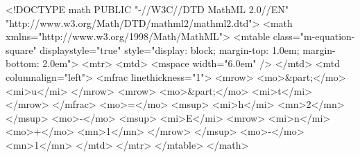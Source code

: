 <!DOCTYPE math 
    PUBLIC "-//W3C//DTD MathML 2.0//EN"
           "http://www.w3.org/Math/DTD/mathml2/mathml2.dtd">
<math xmlns="http://www.w3.org/1998/Math/MathML">
<mtable class="m-equation-square" displaystyle="true" style="display: block; margin-top: 1.0em; margin-bottom: 2.0em">
	<mtr>
		<mtd>
			<mspace width="6.0em" />
		</mtd>
		<mtd columnalign="left">
			<mfrac linethickness="1">
				<mrow>
					<mo>&part;</mo>
					<mi>u</mi>
				</mrow>
				<mrow>
					<mo>&part;</mo>
					<mi>t</mi>
				</mrow>
			</mfrac>
			<mo>=</mo>
			<msup>
				<mi>h</mi>
				<mn>2</mn>
			</msup>
			<mo>-</mo>
			<msup>
				<mi>E</mi>
				<mrow>
					<mi>n</mi>
					<mo>+</mo>
					<mn>1</mn>
				</mrow>
			</msup>
			<mo>-</mo>
			<mn>1</mn>
		</mtd>
	</mtr>
</mtable>
</math>